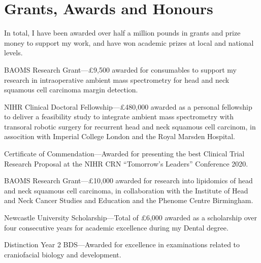 \section*{Grants, Awards and Honours}

In total, I have been awarded over half a million pounds in grants and prize money to support my work, and have won academic prizes at local and national levels.

 BAOMS Research Grant---\pounds9,500 awarded for consumables to support my research in intraoperative ambient mass spectrometry for head and neck squamous cell carcinoma margin detection.

 NIHR Clinical Doctoral Fellowship---\pounds480,000 awarded as a personal fellowship to deliver a feasibility study to integrate ambient mass spectrometry with transoral robotic surgery for recurrent head and neck squamous cell carcinom, in assocition with Imperial College London and the Royal Marsden Hospital.

 Certificate of Commendation---Awarded for presenting the best Clinical Trial Research Proposal at the NIHR CRN ``Tomorrow's Leaders'' Conference 2020.

 BAOMS Research Grant---\pounds10,000 awarded for research into lipidomics of head and neck squamous cell carcinoma, in collaboration with the Institute of Head and Neck Cancer Studies and Education and the Phenome Centre Birmingham.

 Newcastle University Scholarship---Total of \pounds6,000 awarded as a scholarship over four consecutive years for academic excellence during my Dental degree.

 Distinction Year 2 BDS---Awarded for excellence in examinations related to craniofacial biology and development.
